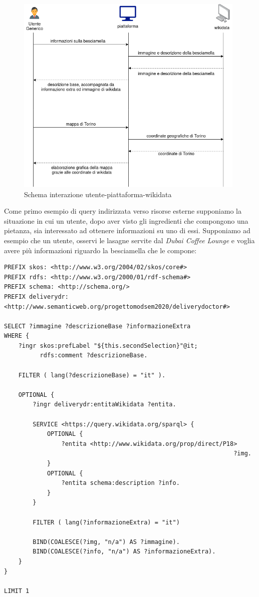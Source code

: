 \documentclass[12pt]{article}
\begin{document}
\begin{figure}[H]
    \centering
         \includegraphics[width=11cm]{files/interazioneEsterna.png}
    \caption{Schema interazione utente-piattaforma-wikidata}
\end{figure}
Come primo esempio di query indirizzata verso risorse esterne supponiamo la situazione in cui un utente, dopo aver visto gli ingredienti che compongono una pietanza, sia interessato ad ottenere informazioni su uno di essi.
\newline
Supponiamo ad esempio che un utente, osservi le lasagne servite dal \textit{Dubai Coffee Lounge} e voglia avere più informazioni riguardo la besciamella che le compone:
\begin{lstlisting}[language=SPARQL]
PREFIX skos: <http://www.w3.org/2004/02/skos/core#>
PREFIX rdfs: <http://www.w3.org/2000/01/rdf-schema#>
PREFIX schema: <http://schema.org/>
PREFIX deliverydr: 
<http://www.semanticweb.org/progettomodsem2020/deliverydoctor#>

SELECT ?immagine ?descrizioneBase ?informazioneExtra
WHERE {
    ?ingr skos:prefLabel "${this.secondSelection}"@it;
          rdfs:comment ?descrizioneBase.

    FILTER ( lang(?descrizioneBase) = "it" ).
    
    OPTIONAL {
        ?ingr deliverydr:entitaWikidata ?entita.
    
        SERVICE <https://query.wikidata.org/sparql> {
            OPTIONAL {
                ?entita <http://www.wikidata.org/prop/direct/P18>
                                                                ?img.
            }
            OPTIONAL {
                ?entita schema:description ?info.
            }
        }
    
        FILTER ( lang(?informazioneExtra) = "it")
    
        BIND(COALESCE(?img, "n/a") AS ?immagine).
        BIND(COALESCE(?info, "n/a") AS ?informazioneExtra).
    }
}

LIMIT 1
\end{lstlisting}
\end{document}
